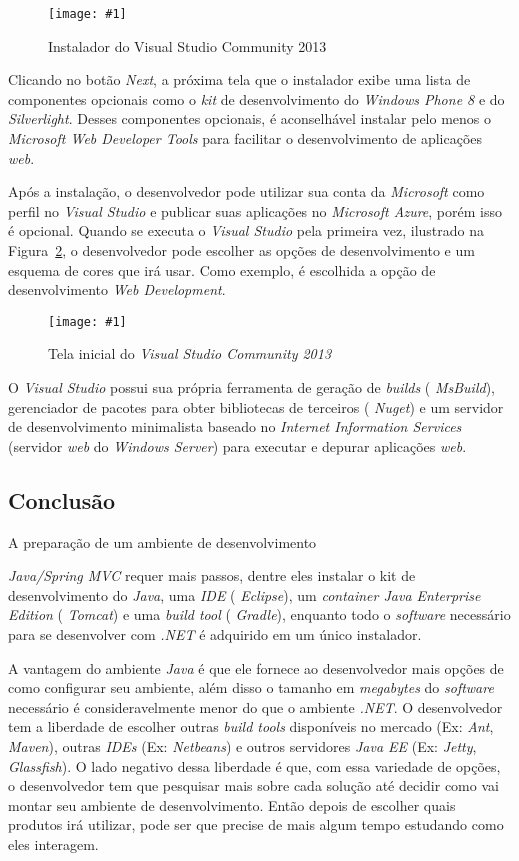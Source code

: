 \documentclass[a4paper,12pt]{article}
\newcommand{\spring} {
\est{Java/Spring MVC}
}
\newcommand{\figura}[3] {
	\begin{figure}[ht]
		\centering
		\texttt{[image: \#1]}
		\caption{#2}
		\label{#3}
	\end{figure}
	\FloatBarrier
}
\newcommand{\est}[1] {
\textit{#1}}
\newcommand{\sigla}[1] {
\textit{#1}}
\newcommand{\lang}[1] {
\textit{#1}}
\begin{document}
\figura{vs1.png}{Instalador do Visual Studio Community 2013}{fig:vs1}

Clicando no botão \est{Next}, a próxima tela que o instalador exibe uma lista de componentes opcionais como o \est{kit} de desenvolvimento do \est{Windows Phone 8} e do \est{Silverlight}. Desses componentes opcionais, é aconselhável instalar pelo menos o \est{Microsoft Web Developer Tools} para facilitar o desenvolvimento de aplicações \est{web}.

Após a instalação, o desenvolvedor pode utilizar sua conta da \est{Microsoft} como perfil no \est{Visual Studio} e publicar suas aplicações no \est{Microsoft Azure}, porém isso é opcional. Quando se executa o \est{Visual Studio} pela primeira vez, ilustrado na Figura~\ref{fig:vs2}, o desenvolvedor pode escolher as opções de desenvolvimento e um esquema de cores que irá usar. Como exemplo, é escolhida a opção de desenvolvimento \est{Web Development}.

\figura{vs2.png}{Tela inicial do \est{Visual Studio Community 2013}}{fig:vs2}

O \est{Visual Studio} possui sua própria ferramenta de geração de \est{builds} (\est{MsBuild}), gerenciador de pacotes para obter bibliotecas de terceiros (\est{Nuget}) e um servidor de desenvolvimento minimalista baseado no \est{Internet Information Services} (servidor \est{web} do \est{Windows Server}) para executar e depurar aplicações \est{web}.  

\subsection{Conclusão}

A preparação de um ambiente de desenvolvimento \spring requer mais passos, dentre eles instalar o kit de desenvolvimento do \est{Java}, uma \sigla{IDE} (\est{Eclipse}), um \est{container Java Enterprise Edition} (\est{Tomcat}) e uma \est{build tool} (\est{Gradle}), enquanto  todo o \est{software} necessário para se desenvolver com \sigla{.NET} é adquirido em um único instalador.

A vantagem do ambiente \lang{Java} é que ele fornece ao desenvolvedor mais opções de como configurar seu ambiente, além disso o tamanho em \est{megabytes} do \est{software} necessário é consideravelmente menor do que o ambiente \sigla{.NET}. O desenvolvedor tem a liberdade de escolher outras \est{build tools} disponíveis no mercado (Ex: \est{Ant}, \est{Maven}), outras \sigla{IDEs} (Ex: \est{Netbeans}) e outros servidores \est{Java EE} (Ex: \est{Jetty}, \est{Glassfish}). O lado negativo dessa liberdade é que, com  essa variedade de opções, o desenvolvedor tem que pesquisar mais sobre cada solução até decidir como vai montar seu ambiente de desenvolvimento. Então depois de escolher quais produtos irá utilizar, pode ser que precise de mais algum tempo estudando como eles interagem.
\end{document}

